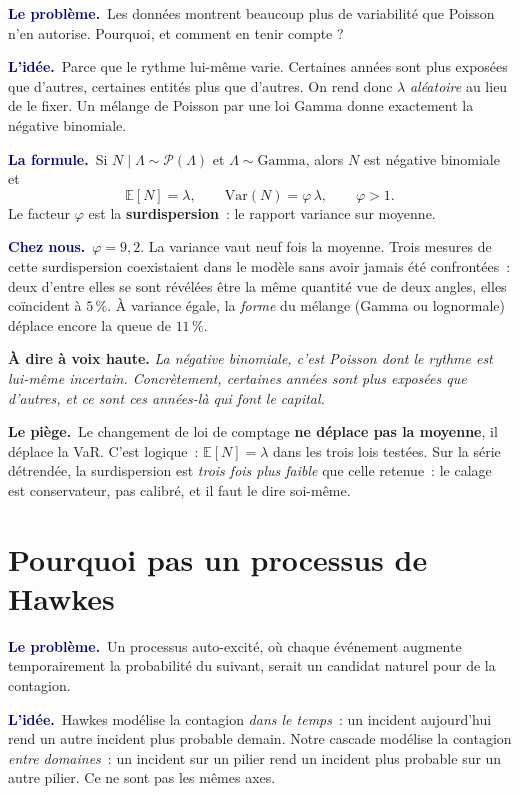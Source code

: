 \documentclass[11pt,a4paper]{article}
\newcommand{\lequoi}[1]{\smallskip\noindent\textcolor{navy}{\textbf{Le problème.}}\ #1\par}
\newcommand{\lidee}[1]{\smallskip\noindent\textcolor{navy}{\textbf{L'idée.}}\ #1\par}
\newcommand{\laformule}[1]{\smallskip\noindent\textcolor{navy}{\textbf{La formule.}}\ #1\par}
\newcommand{\cheznous}[1]{\smallskip\noindent\textcolor{navy}{\textbf{Chez nous.}}\ #1\par}
\newcommand{\lepiege}[1]{\smallskip\noindent\textcolor{accent}{\textbf{Le piège.}}\ #1\par}
\newcommand{\laphrase}[1]{\begin{phrasebox}\textbf{À dire à voix haute.} \emph{#1}\end{phrasebox}}
\begin{document}
\lequoi{Les données montrent beaucoup plus de variabilité que Poisson n'en autorise. Pourquoi,
et comment en tenir compte ?}

\lidee{Parce que le rythme lui-même varie. Certaines années sont plus exposées que
d'autres, certaines entités plus que d'autres. On rend donc $\lambda$ \emph{aléatoire} au
lieu de le fixer. Un mélange de Poisson par une loi Gamma donne exactement la négative
binomiale.}

\laformule{Si $N\mid\Lambda\sim\mathcal{P}(\Lambda)$ et $\Lambda\sim\mathrm{Gamma}$, alors
$N$ est négative binomiale et
\[
  \mathbb{E}[N]=\lambda, \qquad \mathrm{Var}(N)=\varphi\,\lambda, \qquad \varphi>1 .
\]
Le facteur $\varphi$ est la \textbf{surdispersion}~: le rapport variance sur moyenne.}

\cheznous{$\varphi=9{,}2$. La variance vaut neuf fois la moyenne. Trois mesures de cette
surdispersion coexistaient dans le modèle sans avoir jamais été confrontées~: deux d'entre
elles se sont révélées être la même quantité vue de deux angles, elles coïncident à
$5\,\%$. À variance égale, la \emph{forme} du mélange (Gamma ou lognormale) déplace encore
la queue de $11\,\%$.}

\laphrase{La négative binomiale, c'est Poisson dont le rythme est lui-même incertain.
Concrètement, certaines années sont plus exposées que d'autres, et ce sont ces années-là
qui font le capital.}

\lepiege{Le changement de loi de comptage \textbf{ne déplace pas la moyenne}, il déplace la
VaR. C'est logique~: $\mathbb{E}[N]=\lambda$ dans les trois lois testées. Sur la série
détrendée, la surdispersion est \emph{trois fois plus faible} que celle retenue~: le calage
est conservateur, pas calibré, et il faut le dire soi-même.}

\section{Pourquoi pas un processus de Hawkes}

\lequoi{Un processus auto-excité, où chaque événement augmente temporairement la
probabilité du suivant, serait un candidat naturel pour de la contagion.}

\lidee{Hawkes modélise la contagion \emph{dans le temps}~: un incident aujourd'hui rend un
autre incident plus probable demain. Notre cascade modélise la contagion \emph{entre
domaines}~: un incident sur un pilier rend un incident plus probable sur un autre pilier.
Ce ne sont pas les mêmes axes.}
\end{document}
